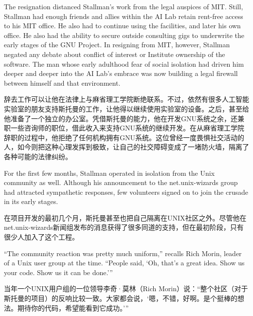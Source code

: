 \ifdefined\eng
The resignation distanced Stallman's work from the legal auspices of MIT. Still, Stallman had enough friends and allies within the AI Lab \ifdefined\vone retain rent-free access to his MIT office. He also had \fi\ifdefined\vtwo to continue using the facilities, and later his own office. He also had the \fi ability to secure outside consulting gigs to underwrite the early stages of the GNU Project. In resigning from MIT, however, Stallman negated any debate about conflict of interest or Institute ownership of the software. The man whose early adulthood fear of social isolation had driven him deeper and deeper into the AI Lab's embrace was now building a legal firewall between himself and that environment.
\fi

\ifdefined\chs
辞去工作可以让他在法律上与麻省理工学院断绝联系。不过，依然有很多人工智能实验室的朋友支持斯托曼的工作，让他得以继续使用实验室的设备。\ifdefined\vtwo 之后，甚至给他准备了一个独立的办公室。\fi 凭借斯托曼的能力，他在开发GNU系统之余，还兼职一些咨询师的职位，借此收入来支持GNU系统的继续开发。在从麻省理工学院辞职的过程中，他拒绝了任何机构拥有GNU系统。这位曾经一度畏惧社交活动的人，如今则把这种心理发挥到极致，让自己的社交障碍变成了一堵防火墙，隔离了各种可能的法律纠纷。
\fi

\ifdefined\eng
For the first few months, Stallman operated in isolation from the Unix community as well. Although his announcement to the net.unix-wizards group had attracted sympathetic responses, few volunteers signed on to join the crusade in its early stages.
\fi

\ifdefined\chs
在项目开发的最初几个月，斯托曼甚至也把自己隔离在UNIX社区之外。尽管他在net.unix-wizards新闻组发布的消息获得了很多同道的支持，但在最初阶段，只有很少人加入了这个工程。
\fi

\ifdefined\eng
``The community reaction was pretty much uniform,'' recalls Rich Morin, leader of a Unix user group at the time. ``People said, `Oh, that's a great idea. Show us your code. Show us it can be done.'\hspace{0.01in}''
\fi

\ifdefined\chs
当年一个UNIX用户组的一位领导李奇·莫林（Rich Morin）说：``整个社区（对于斯托曼的项目）的反响比较一致。大家都会说，`嗯，不错，好啊。是个挺棒的想法。期待你的代码，希望能看到它成功。'\hspace{0.01in}''
\fi

